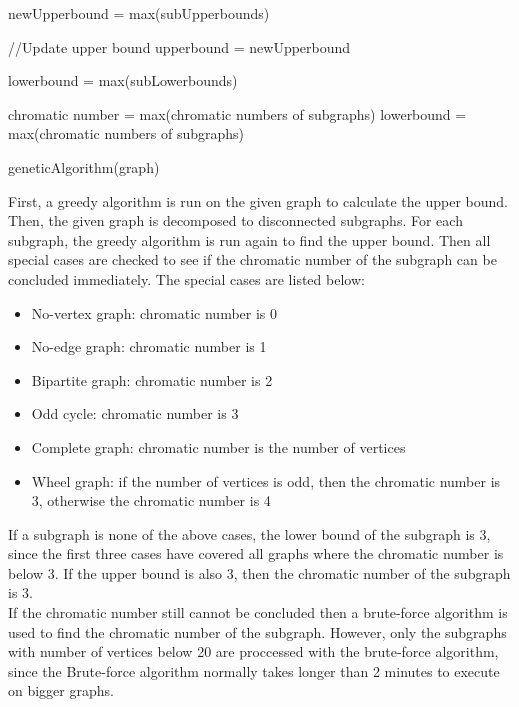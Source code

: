 \documentclass[a4paper]{report}
\begin{document}
		\begin{algorithm}                     
			\begin{algorithmic} [1]     

			\STATE newUpperbound = max(subUpperbounds)
			
			\STATE //Update upper bound
			\STATE upperbound = newUpperbound 
			\ENDIF
			
			\STATE lowerbound = max(subLowerbounds)
			
			\STATE chromatic number = max(chromatic numbers of subgraphs)
			\ELSE
			\STATE lowerbound = max(chromatic numbers of subgraphs)
			\ENDIF
			
			\STATE geneticAlgorithm(graph)
		\end{algorithmic}
	\end{algorithm}
	First, a greedy algorithm is run on the given graph to calculate the upper bound. Then, the given graph is decomposed to disconnected subgraphs. For each subgraph, the greedy algorithm is run again to find the upper bound. Then all special cases are checked to see if the chromatic number of the subgraph can be concluded immediately. The special cases are listed below: 
	\begin{itemize}
		\item No-vertex graph: chromatic number is 0
		\item No-edge graph: chromatic number is 1
		\item Bipartite graph: chromatic number is 2
		\item Odd cycle: chromatic number is 3
		\item Complete graph: chromatic number is the number of vertices
		\item Wheel graph: if the number of vertices is odd, then the chromatic number is 3, otherwise the chromatic number is 4
	\end{itemize}
	If a subgraph is none of the above cases, the lower bound of the subgraph is 3, since the first three cases have covered all graphs where the chromatic number is below 3. If the upper bound is also 3, then the chromatic number of the subgraph is 3. \\
	If the chromatic number still cannot be concluded then a brute-force algorithm is used to find the chromatic number of the subgraph. However, only the subgraphs with number of vertices below 20 are proccessed with the brute-force algorithm, since the Brute-force algorithm normally takes longer than 2 minutes to execute on bigger graphs. \\
\end{document}
